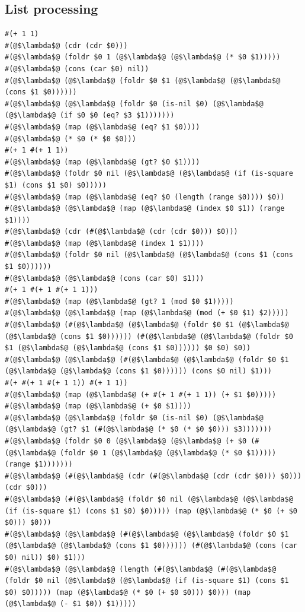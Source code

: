 \documentclass{article}
\begin{document}
\subsection{List processing}
\begin{lstlisting}
#(+ 1 1)
#(@$\lambda$@ (cdr (cdr $0)))
#(@$\lambda$@ (foldr $0 1 (@$\lambda$@ (@$\lambda$@ (* $0 $1)))))
#(@$\lambda$@ (cons (car $0) nil))
#(@$\lambda$@ (@$\lambda$@ (foldr $0 $1 (@$\lambda$@ (@$\lambda$@ (cons $1 $0))))))
#(@$\lambda$@ (@$\lambda$@ (foldr $0 (is-nil $0) (@$\lambda$@ (@$\lambda$@ (if $0 $0 (eq? $3 $1)))))))
#(@$\lambda$@ (map (@$\lambda$@ (eq? $1 $0))))
#(@$\lambda$@ (* $0 (* $0 $0)))
#(+ 1 #(+ 1 1))
#(@$\lambda$@ (map (@$\lambda$@ (gt? $0 $1))))
#(@$\lambda$@ (foldr $0 nil (@$\lambda$@ (@$\lambda$@ (if (is-square $1) (cons $1 $0) $0)))))
#(@$\lambda$@ (map (@$\lambda$@ (eq? $0 (length (range $0)))) $0))
#(@$\lambda$@ (@$\lambda$@ (map (@$\lambda$@ (index $0 $1)) (range $1))))
#(@$\lambda$@ (cdr (#(@$\lambda$@ (cdr (cdr $0))) $0)))
#(@$\lambda$@ (map (@$\lambda$@ (index 1 $1))))
#(@$\lambda$@ (foldr $0 nil (@$\lambda$@ (@$\lambda$@ (cons $1 (cons $1 $0))))))
#(@$\lambda$@ (@$\lambda$@ (cons (car $0) $1)))
#(+ 1 #(+ 1 #(+ 1 1)))
#(@$\lambda$@ (map (@$\lambda$@ (gt? 1 (mod $0 $1)))))
#(@$\lambda$@ (@$\lambda$@ (map (@$\lambda$@ (mod (+ $0 $1) $2)))))
#(@$\lambda$@ (#(@$\lambda$@ (@$\lambda$@ (foldr $0 $1 (@$\lambda$@ (@$\lambda$@ (cons $1 $0)))))) (#(@$\lambda$@ (@$\lambda$@ (foldr $0 $1 (@$\lambda$@ (@$\lambda$@ (cons $1 $0)))))) $0 $0) $0))
#(@$\lambda$@ (@$\lambda$@ (#(@$\lambda$@ (@$\lambda$@ (foldr $0 $1 (@$\lambda$@ (@$\lambda$@ (cons $1 $0)))))) (cons $0 nil) $1)))
#(+ #(+ 1 #(+ 1 1)) #(+ 1 1))
#(@$\lambda$@ (map (@$\lambda$@ (+ #(+ 1 #(+ 1 1)) (+ $1 $0)))))
#(@$\lambda$@ (map (@$\lambda$@ (+ $0 $1))))
#(@$\lambda$@ (@$\lambda$@ (foldr $0 (is-nil $0) (@$\lambda$@ (@$\lambda$@ (gt? $1 (#(@$\lambda$@ (* $0 (* $0 $0))) $3)))))))
#(@$\lambda$@ (foldr $0 0 (@$\lambda$@ (@$\lambda$@ (+ $0 (#(@$\lambda$@ (foldr $0 1 (@$\lambda$@ (@$\lambda$@ (* $0 $1))))) (range $1)))))))
#(@$\lambda$@ (#(@$\lambda$@ (cdr (#(@$\lambda$@ (cdr (cdr $0))) $0))) (cdr $0)))
#(@$\lambda$@ (#(@$\lambda$@ (foldr $0 nil (@$\lambda$@ (@$\lambda$@ (if (is-square $1) (cons $1 $0) $0))))) (map (@$\lambda$@ (* $0 (+ $0 $0))) $0)))
#(@$\lambda$@ (@$\lambda$@ (#(@$\lambda$@ (@$\lambda$@ (foldr $0 $1 (@$\lambda$@ (@$\lambda$@ (cons $1 $0)))))) (#(@$\lambda$@ (cons (car $0) nil)) $0) $1)))
#(@$\lambda$@ (@$\lambda$@ (length (#(@$\lambda$@ (#(@$\lambda$@ (foldr $0 nil (@$\lambda$@ (@$\lambda$@ (if (is-square $1) (cons $1 $0) $0))))) (map (@$\lambda$@ (* $0 (+ $0 $0))) $0))) (map (@$\lambda$@ (- $1 $0)) $1)))))

\end{lstlisting}
\end{document}

